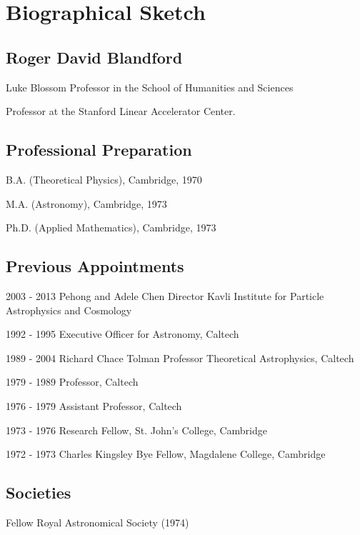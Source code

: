 \setlength{\textheight}{9in}
\setlength{\topmargin}{0in}
\setlength{\baselineskip}{0.1in}
\setlength{\textwidth}{6.3in} 
\setlength{\oddsidemargin}{0in}  

\def\cf{{\it cf.}}
\def\eg{{\it e.g.}}
\def\ie{{\it i.e.}}
\def\etal{{\it et al.}}
\def\etc{{\it etc}}
\def\ni{\noindent}
\def\go{\mathrel{\raise.3ex\hbox{$>$}\mkern-14mu\lower0.6ex\hbox{$\sim$}}}
\def\lo{\mathrel{\raise.3ex\hbox{$<$}\mkern-14mu\lower0.6ex\hbox{$\sim$}}}

\parindent=0pt
\section*{Biographical Sketch}
\subsection*{Roger David Blandford}
Luke Blossom Professor in the School of Humanities and Sciences

Professor at the Stanford Linear Accelerator Center.
\subsection*{Professional Preparation}
B.A. (Theoretical Physics), Cambridge, 1970

M.A. (Astronomy), Cambridge, 1973

Ph.D. (Applied Mathematics), Cambridge, 1973

\subsection*{Previous Appointments}
2003 - 2013 Pehong and Adele Chen Director Kavli Institute for Particle Astrophysics and Cosmology

1992 - 1995 Executive Officer for Astronomy, Caltech

1989 - 2004 Richard Chace Tolman Professor Theoretical  Astrophysics, Caltech 

1979 - 1989 Professor, Caltech

1976 - 1979 Assistant Professor, Caltech

1973 - 1976 Research Fellow, St. John's College, Cambridge

1972 - 1973 Charles Kingsley Bye Fellow, Magdalene College, Cambridge 

\subsection*{Societies}
Fellow Royal Astronomical Society (1974)

